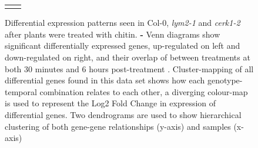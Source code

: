 \documentclass[../main.tex]{subfiles}
\begin{document}
\begin{figure}[!t]
\begin{tabular}[b]{cc}
{      }
  \end{tabular}
  \label{fig:chitinTranscripts}
  \caption{Differential expression patterns seen in Col-0,
    \textit{lym2-1} and \textit{cerk1-2} after plants were treated
    with chitin. \textbf{\protect{} -
      \protect{}} Venn diagrams show significant
    differentially expressed genes, up-regulated on left and
    down-regulated on right, and their overlap of between treatments
    at both 30 minutes \textbf{\protect{}} and 6
    hours post-treatment
    \textbf{\protect{}}. \textbf{\protect{}}
    Cluster-mapping of all differential genes found in this data set
    shows how each genotype-temporal combination relates to each
    other, a diverging colour-map is used to represent the Log2 Fold
    Change in expression of differential genes. Two dendrograms are
    used to show hierarchical clustering of both gene-gene
    relationships (y-axis) and samples (x-axis)}
\end{figure}







\end{document}

